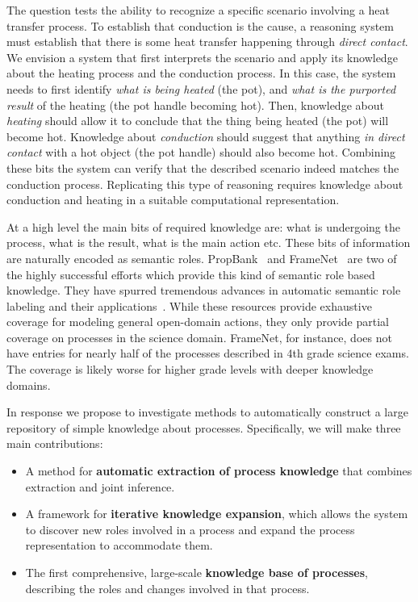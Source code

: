 The question tests the ability to recognize a specific scenario involving a heat transfer process.
To establish that conduction is the cause, a reasoning system must establish that there is some heat transfer happening through {\em direct contact}. 
We envision a system that first interprets the scenario and apply its knowledge about the heating process and the conduction process. 
In this case, the system needs to first identify {\em what is being heated} (the pot), and {\em what is the purported result} of the heating (the pot handle becoming hot). 
Then, knowledge about {\em heating} should allow it to conclude that the thing being heated (the pot) will become hot. 
Knowledge about {\em conduction} should suggest that anything {\em in direct contact} with a hot object (the pot handle) should also become hot.
Combining these bits the system can verify that the described scenario indeed matches the conduction process.
Replicating this type of reasoning requires knowledge about conduction and heating in a suitable computational representation.

At a high level the main bits of required knowledge are: what is undergoing the process, what is the result, what is the main action etc.
These bits of information are naturally encoded as semantic roles.
PropBank~\cite{kingsbury2003propbank} and FrameNet~\cite{baker1998berkeley} are two of the highly successful efforts which provide this kind of semantic role based knowledge.
They have spurred tremendous advances in automatic semantic role labeling and their applications~\cite{gildea2002automatic,surdeanu2008conll,feizabadi2015combining,roth2015context}.
While these resources provide exhaustive coverage for modeling general open-domain actions, they only provide partial coverage on processes in the science domain.
FrameNet, for instance, does not have entries for nearly half of the processes described in 4th grade science exams. 
The coverage is likely worse for higher grade levels with deeper knowledge domains. 

In response we propose to investigate methods to automatically construct a large repository of simple knowledge about processes. Specifically, we will make three main contributions:
\begin{itemize}
\item A method for {\bf automatic extraction of process knowledge} that combines extraction and joint inference.
\item A framework for {\bf iterative knowledge expansion}, which allows the system to discover new roles
     involved in a process and expand the process representation to accommodate them.
\item The first comprehensive, large-scale {\bf knowledge base of processes}, describing the roles
      and changes involved in that process.
\end{itemize}


